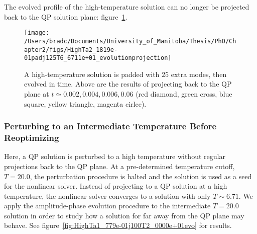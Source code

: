 \documentclass[../PhD.tex]{subfiles}
\begin{document}
The evolved profile of the high-temperature solution can no longer be projected back to the QP solution plane: figure~\ref{fig: HighTa2_1819e-01padj125T6_6711e+01_evolutionprojection}.

\begin{figure}[h]
	\centering
	\texttt{[image: /Users/bradc/Documents/University\_of\_Manitoba/Thesis/PhD/Chapter2/figs/HighTa2\_1819e-01padj125T6\_6711e+01\_evolutionprojection]}
	\caption[Evolution of the spectrum of a high-temperature solution padded with $25$ modes]{A high-temperature solution is padded with $25$ extra modes, then evolved in time. Above are the results of projecting back to the QP plane at $t \simeq 0.002, 0.004, 0.006, 0.06$ (red diamond, green cross, blue square, yellow triangle, magenta cirlce).}
	\label{fig: HighTa2_1819e-01padj125T6_6711e+01_evolutionprojection}
\end{figure}



\subsubsection{Perturbing to an Intermediate Temperature Before Reoptimizing}

Here, a QP solution is perturbed to a high temperature without regular projections back to the QP plane. At a pre-determined temperature cutoff, $T = 20.0$, the perturbation procedure is halted and the solution is used as a seed for the nonlinear solver. Instead of projecting to a QP solution at a high temperature, the nonlinear solver converges to a solution with only $T \sim 6.71$. We apply the amplitude-phase evolution procedure to the intermediate $T = 20.0$ solution in order to study how a solution for far away from the QP plane may behave. See figure~\ref{fig:HighTa1_779e-01j100T2_0000e+01evo} for results.
\end{document}
